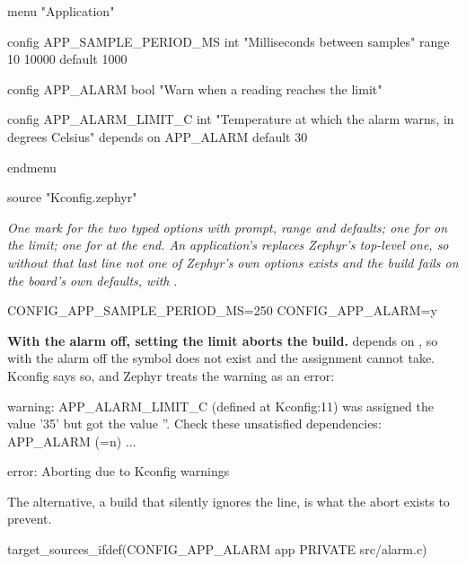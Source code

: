 \begin{kconfigcode}
menu "Application"

config APP_SAMPLE_PERIOD_MS
	int "Milliseconds between samples"
	range 10 10000
	default 1000

config APP_ALARM
	bool "Warn when a reading reaches the limit"

config APP_ALARM_LIMIT_C
	int "Temperature at which the alarm warns, in degrees Celsius"
	depends on APP_ALARM
	default 30

endmenu

source "Kconfig.zephyr"
\end{kconfigcode}

\noindent{}

\noindent\emph{One mark for the two typed options with prompt, range and defaults; one for
 on the limit; one for  at the end. An
application's  replaces Zephyr's top-level one, so without that last line not one of
Zephyr's own options exists and the build fails on the board's own defaults, with}
.

\begin{kconfigcode}
CONFIG_APP_SAMPLE_PERIOD_MS=250
CONFIG_APP_ALARM=y
\end{kconfigcode}

\noindent{}

\textbf{With the alarm off, setting the limit aborts the build.}  depends on
, so with the alarm off the symbol does not exist and the assignment cannot take.
Kconfig says so, and Zephyr treats the warning as an error:

\begin{console}
warning: APP_ALARM_LIMIT_C (defined at Kconfig:11) was assigned the value '35' but got the
value ''. Check these unsatisfied dependencies: APP_ALARM (=n) ...

error: Aborting due to Kconfig warnings
\end{console}

\noindent The alternative, a build that silently ignores the line, is what the abort exists to
prevent. 


\begin{cmakecode}
target_sources_ifdef(CONFIG_APP_ALARM app PRIVATE src/alarm.c)
\end{cmakecode}

